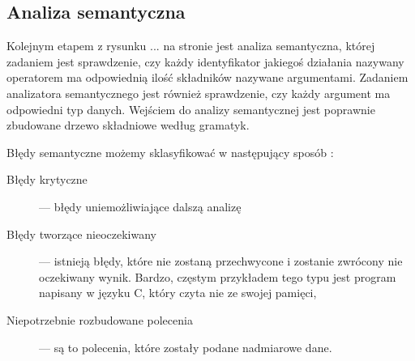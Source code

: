 \subsection{Analiza semantyczna}
Kolejnym etapem z rysunku ... na stronie jest analiza semantyczna,
 której zadaniem jest sprawdzenie, 
 czy każdy identyfikator jakiegoś działania nazywany operatorem ma odpowiednią ilość składników nazywane argumentami.
Zadaniem analizatora semantycznego jest również sprawdzenie, czy każdy argument ma odpowiedni typ danych.
Wejściem do analizy semantycznej jest poprawnie zbudowane drzewo składniowe według gramatyk. \cite{aho}

 Błędy semantyczne możemy sklasyfikować w następujący sposób \cite{link_semantic}:
\begin{description}
 \item[Błędy krytyczne] ---
    błędy uniemożliwiające dalszą analizę 
 \item[Błędy tworzące nieoczekiwany] --- 
    istnieją błędy, które nie zostaną przechwycone i zostanie zwrócony nie oczekiwany wynik. Bardzo,
    częstym przykładem tego typu jest program napisany w języku C, który czyta nie ze swojej pamięci,
 \item[Niepotrzebnie rozbudowane polecenia] --- są to polecenia, które zostały podane nadmiarowe dane.
\end{description}


\begin{comment} 
\end{comment}